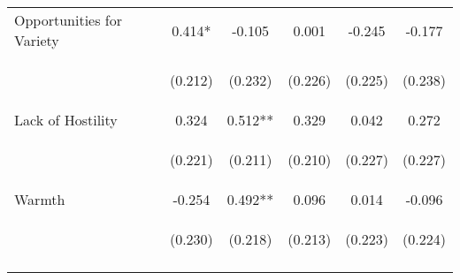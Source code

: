 \begin{tabular}{lccccc}
\noalign{\smallskip}Opportunities for Variety & 0.414* & -0.105 & 0.001 & -0.245 & -0.177\\
 & \begin{footnotesize}(0.212)\end{footnotesize} & \begin{footnotesize}(0.232)\end{footnotesize} & \begin{footnotesize}(0.226)\end{footnotesize} & \begin{footnotesize}(0.225)\end{footnotesize} & \begin{footnotesize}(0.238)\end{footnotesize}\\
\noalign{\smallskip}Lack of Hostility & 0.324 & 0.512** & 0.329 & 0.042 & 0.272\\
 & \begin{footnotesize}(0.221)\end{footnotesize} & \begin{footnotesize}(0.211)\end{footnotesize} & \begin{footnotesize}(0.210)\end{footnotesize} & \begin{footnotesize}(0.227)\end{footnotesize} & \begin{footnotesize}(0.227)\end{footnotesize}\\
\noalign{\smallskip}Warmth & -0.254 & 0.492** & 0.096 & 0.014 & -0.096\\
 & \begin{footnotesize}(0.230)\end{footnotesize} & \begin{footnotesize}(0.218)\end{footnotesize} & \begin{footnotesize}(0.213)\end{footnotesize} & \begin{footnotesize}(0.223)\end{footnotesize} & \begin{footnotesize}(0.224)\end{footnotesize}\\
\noalign{\smallskip}\hline\end{tabular}\\
